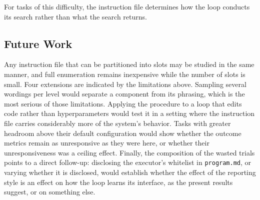 \documentclass[11pt]{article}
\begin{document}
For tasks of this difficulty, the instruction file determines how the loop conducts its search rather than what the search returns.

\subsection{Future Work}

Any instruction file that can be partitioned into slots may be studied in the same manner, and full enumeration remains inexpensive while the number of slots is small. Four extensions are indicated by the limitations above. Sampling several wordings per level would separate a component from its phrasing, which is the most serious of those limitations. Applying the procedure to a loop that edits code rather than hyperparameters would test it in a setting where the instruction file carries considerably more of the system's behavior. Tasks with greater headroom above their default configuration would show whether the outcome metrics remain as unresponsive as they were here, or whether their unresponsiveness was a ceiling effect. Finally, the composition of the wasted trials points to a direct follow-up: disclosing the executor's whitelist in \texttt{program.md}, or varying whether it is disclosed, would establish whether the effect of the reporting style is an effect on how the loop learns its interface, as the present results suggest, or on something else.
\end{document}
